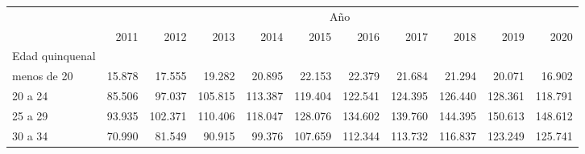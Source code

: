 \begin{tabular}{lllllllllll}
\cline{1-11}
\multicolumn{1}{c}{} &
  \multicolumn{10}{|c}{Año} \\
\multicolumn{1}{c}{} &
  \multicolumn{1}{|r}{2011} &
  \multicolumn{1}{r}{2012} &
  \multicolumn{1}{r}{2013} &
  \multicolumn{1}{r}{2014} &
  \multicolumn{1}{r}{2015} &
  \multicolumn{1}{r}{2016} &
  \multicolumn{1}{r}{2017} &
  \multicolumn{1}{r}{2018} &
  \multicolumn{1}{r}{2019} &
  \multicolumn{1}{r}{2020} \\
\cline{1-11}
\multicolumn{1}{l}{Edad quinquenal} &
  \multicolumn{1}{|r}{} &
  \multicolumn{1}{r}{} &
  \multicolumn{1}{r}{} &
  \multicolumn{1}{r}{} &
  \multicolumn{1}{r}{} &
  \multicolumn{1}{r}{} &
  \multicolumn{1}{r}{} &
  \multicolumn{1}{r}{} &
  \multicolumn{1}{r}{} &
  \multicolumn{1}{r}{} \\
\multicolumn{1}{l}{\hspace{1em}menos de 20} &
  \multicolumn{1}{|r}{15.878} &
  \multicolumn{1}{r}{17.555} &
  \multicolumn{1}{r}{19.282} &
  \multicolumn{1}{r}{20.895} &
  \multicolumn{1}{r}{22.153} &
  \multicolumn{1}{r}{22.379} &
  \multicolumn{1}{r}{21.684} &
  \multicolumn{1}{r}{21.294} &
  \multicolumn{1}{r}{20.071} &
  \multicolumn{1}{r}{16.902} \\
\multicolumn{1}{l}{\hspace{1em}20 a 24} &
  \multicolumn{1}{|r}{85.506} &
  \multicolumn{1}{r}{97.037} &
  \multicolumn{1}{r}{105.815} &
  \multicolumn{1}{r}{113.387} &
  \multicolumn{1}{r}{119.404} &
  \multicolumn{1}{r}{122.541} &
  \multicolumn{1}{r}{124.395} &
  \multicolumn{1}{r}{126.440} &
  \multicolumn{1}{r}{128.361} &
  \multicolumn{1}{r}{118.791} \\
\multicolumn{1}{l}{\hspace{1em}25 a 29} &
  \multicolumn{1}{|r}{93.935} &
  \multicolumn{1}{r}{102.371} &
  \multicolumn{1}{r}{110.406} &
  \multicolumn{1}{r}{118.047} &
  \multicolumn{1}{r}{128.076} &
  \multicolumn{1}{r}{134.602} &
  \multicolumn{1}{r}{139.760} &
  \multicolumn{1}{r}{144.395} &
  \multicolumn{1}{r}{150.613} &
  \multicolumn{1}{r}{148.612} \\
\multicolumn{1}{l}{\hspace{1em}30 a 34} &
  \multicolumn{1}{|r}{70.990} &
  \multicolumn{1}{r}{81.549} &
  \multicolumn{1}{r}{90.915} &
  \multicolumn{1}{r}{99.376} &
  \multicolumn{1}{r}{107.659} &
  \multicolumn{1}{r}{112.344} &
  \multicolumn{1}{r}{113.732} &
  \multicolumn{1}{r}{116.837} &
  \multicolumn{1}{r}{123.249} &
  \multicolumn{1}{r}{125.741} \\

\end{tabular}
